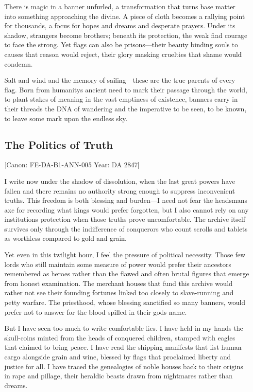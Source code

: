 There is magic in a banner unfurled, a transformation that turns base
matter into something approaching the divine. A piece of cloth becomes a
rallying point for thousands, a focus for hopes and dreams and desperate
prayers. Under its shadow, strangers become brothers; beneath its
protection, the weak find courage to face the strong. Yet flags can also
be prisons---their beauty binding souls to causes that reason would
reject, their glory masking cruelties that shame would condemn.

Salt and wind and the memory of sailing---these are the true parents of
every flag. Born from humanity\textquotesingle s ancient need to mark
their passage through the world, to plant stakes of meaning in the vast
emptiness of existence, banners carry in their threads the DNA of
wandering and the imperative to be seen, to be known, to leave some mark
upon the endless sky.

\subsection{The Politics of Truth}\label{the-politics-of-truth}

{[}Canon: FE-DA-B1-ANN-005 \textbar{} Year: DA 2847{]}

I write now under the shadow of dissolution, when the last great powers
have fallen and there remains no authority strong enough to suppress
inconvenient truths. This freedom is both blessing and burden---I need
not fear the headsman\textquotesingle s axe for recording what kings
would prefer forgotten, but I also cannot rely on any
institution\textquotesingle s protection when those truths prove
uncomfortable. The archive itself survives only through the indifference
of conquerors who count scrolls and tablets as worthless compared to
gold and grain.

Yet even in this twilight hour, I feel the pressure of political
necessity. Those few lords who still maintain some measure of power
would prefer their ancestors remembered as heroes rather than the flawed
and often brutal figures that emerge from honest examination. The
merchant houses that fund this archive would rather not see their
founding fortunes linked too closely to slave-running and petty warfare.
The priesthood, whose blessing sanctified so many banners, would prefer
not to answer for the blood spilled in their god\textquotesingle s name.

But I have seen too much to write comfortable lies. I have held in my
hands the skull-coins minted from the heads of conquered children,
stamped with eagles that claimed to bring peace. I have read the
shipping manifests that list human cargo alongside grain and wine,
blessed by flags that proclaimed liberty and justice for all. I have
traced the genealogies of noble houses back to their origins in rape and
pillage, their heraldic beasts drawn from nightmares rather than dreams.

